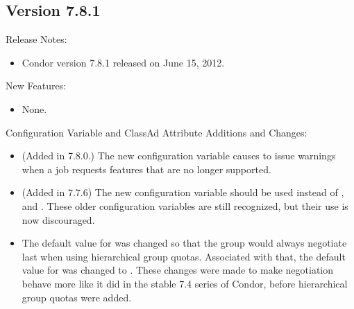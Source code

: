 \subsection*{\label{sec:New-7-8-1}Version 7.8.1}

\noindent Release Notes:

\begin{itemize}

\item Condor version 7.8.1 released on June 15, 2012.

\end{itemize}


\noindent New Features:

\begin{itemize}

\item None.

\end{itemize}

\noindent Configuration Variable and ClassAd Attribute Additions and Changes:

\begin{itemize}

\item (Added in 7.8.0.) The new configuration variable
 causes  to issue
warnings when a job requests features that are no longer supported.

\item (Added in 7.7.6) The new configuration variable
 should be used instead of ,
 and . These older configuration
variables are still recognized, but their use is now discouraged.

\item The default value for  was changed 
so that the  group would always negotiate last 
when using hierarchical group quotas.
Associated with that, 
the default value for  
was changed to .  
These changes were made to make negotiation behave more like it did 
in the stable 7.4 series of Condor,
before hierarchical group quotas were added.

\end{itemize}

